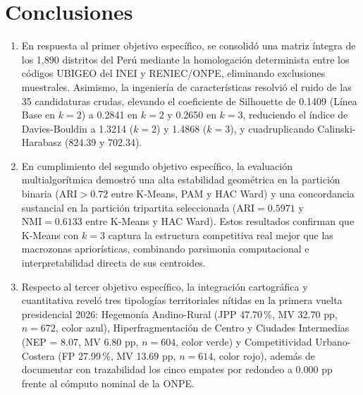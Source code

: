 \documentclass[conference,10pt,letterpaper]{IEEEtran}
\begin{document}
\section{Conclusiones}

\begin{enumerate}
    \item En respuesta al primer objetivo específico, se consolidó una matriz íntegra de los 1,890 distritos del Perú mediante la homologación determinista entre los códigos UBIGEO del INEI y RENIEC/ONPE, eliminando exclusiones muestrales. Asimismo, la ingeniería de características resolvió el ruido de las 35 candidaturas crudas, elevando el coeficiente de Silhouette de 0.1409 (Línea Base en $k = 2$) a 0.2841 en $k = 2$ y 0.2650 en $k = 3$, reduciendo el índice de Davies-Bouldin a 1.3214 ($k = 2$) y 1.4868 ($k = 3$), y cuadruplicando Calinski-Harabasz (824.39 y 702.34).
    \item En cumplimiento del segundo objetivo específico, la evaluación multialgorítmica demostró una alta estabilidad geométrica en la partición binaria ($\mathrm{ARI} > 0.72$ entre K-Means, PAM y HAC Ward) y una concordancia sustancial en la partición tripartita seleccionada ($\mathrm{ARI} = 0.5971$ y $\mathrm{NMI} = 0.6133$ entre K-Means y HAC Ward). Estos resultados confirman que K-Means con $k = 3$ captura la estructura competitiva real mejor que las macrozonas apriorísticas, combinando parsimonia computacional e interpretabilidad directa de sus centroides.
    \item Respecto al tercer objetivo específico, la integración cartográfica y cuantitativa reveló tres tipologías territoriales nítidas en la primera vuelta presidencial 2026: Hegemonía Andino-Rural (JPP 47.70\,\%, MV 32.70 pp, $n = 672$, color azul), Hiperfragmentación de Centro y Ciudades Intermedias (NEP = 8.07, MV 6.80 pp, $n = 604$, color verde) y Competitividad Urbano-Costera (FP 27.99\,\%, MV 13.69 pp, $n = 614$, color rojo), además de documentar con trazabilidad los cinco empates por redondeo a 0.000 pp frente al cómputo nominal de la ONPE.

\end{enumerate}
\end{document}
